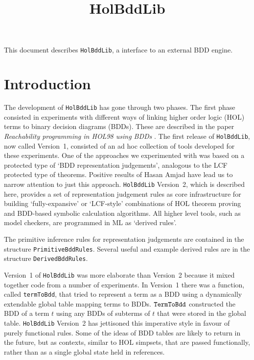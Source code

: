 \documentclass[12pt,fleqn]{article}
\title{HolBddLib}
\date{}
\renewcommand{\t}[1]{\mbox{\tt #1}}
\begin{document}
\maketitle
{}

This document describes {\tt HolBddLib}, a \HOL{} interface to an external BDD engine.

\section{Introduction}

The development of {\tt HolBddLib} has gone through two phases.  The
first phase consisted in experiments with different ways of linking
higher order logic (HOL) terms to binary decision diagrams (BDDs).
These are described in the paper {\it Reachability programming in HOL98 using BDDs\/} \cite{tphols2000-Gordon}. The first release of
\t{HolBddLib}, now called Version~1, consisted of an ad hoc collection
of tools developed for these experiments.  One of the approaches we
experimented with was based on a protected type of `BDD representation
judgements', analogous to the LCF protected type of theorems.
Positive results of Hasan Amjad \cite{Amjad:TPHOLs2001} have lead us
to narrow attention to just this approach. \t{HolBddLib} Version~2,
which is described here, provides a set of representation judgement
rules as core infrastructure for building `fully-expansive' or
`LCF-style' combinations of HOL theorem proving and BDD-based symbolic
calculation algorithms. All higher level tools, such as model
checkers, are programmed in ML as `derived rules'.

The primitive inference rules for representation judgements are contained in the structure
{\tt{PrimitiveBddRules}}. Several useful and example  derived rules are in the
structure {\tt{DerivedBddRules}}.

Version~1 of {\tt{HolBddLib}} was more elaborate than Version~2
because it mixed together code from a number of experiments.
In Version~1 there was a function, called
{\texttt{termToBdd}}, that tried to represent a \HOL{} term as a BDD
using a dynamically extendable global table mapping \HOL{} terms to
BDDs.  $\t{TermToBdd}$ constructed the BDD of a term $t$ using any
BDDs of subterms of $t$ that were stored in the global table.
{\tt{HolBddLib}} Version~2 has jettisoned this imperative style
in favour of purely functional rules. Some of
the ideas of BDD tables are likely to return in the future, but as
contexts, similar to HOL simpsets, that are passed functionally,
rather than as a single global state held in references.
\end{document}
